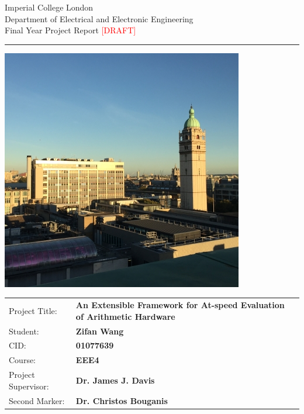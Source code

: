 \begin{titlepage}
  { \Large
    Imperial College London\\[17pt]
    Department of Electrical and Electronic Engineering\\[17pt]
    Final Year Project Report \textcolor{red}{[DRAFT]}
  }

  \rule{\columnwidth}{3pt}
  \vfill
  \centering
  \includegraphics[width=0.7\columnwidth]{img/1.jpg}
  \vfill

  \begin{table}[h]
  \def\arraystretch{1.8}
    \begin{tabular}{p{40mm} >{\bfseries} p{\dimexpr\columnwidth-40mm}}
      Project Title: & An Extensible Framework for \newline At-speed Evaluation of Arithmetic Hardware \\
      Student:       & Zifan Wang \\
      CID:           & 01077639 \\
      Course:        & EEE4 \\
      Project Supervisor: & Dr. James J. Davis \\
      Second Marker: & Dr. Christos Bouganis
    \end{tabular}
  \end{table}
\end{titlepage}